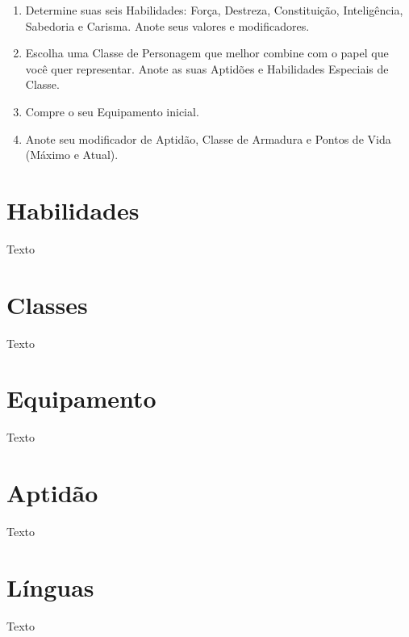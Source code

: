 \documentclass[a5paper, 10pt]{book}
\begin{document}
\begin{enumerate}
	\item Determine suas seis Habilidades: Força, Destreza, Constituição, Inteligência, Sabedoria e Carisma. Anote seus valores e modificadores.
	\item Escolha uma Classe de Personagem que melhor combine com o papel que você quer representar. Anote as suas Aptidões e Habilidades Especiais de Classe.
	\item Compre o seu Equipamento inicial.
	\item Anote seu modificador de Aptidão, Classe de Armadura e Pontos de Vida (Máximo e Atual).
\end{enumerate}

\section{Habilidades}

Texto

\section{Classes}

Texto

\section{Equipamento}

Texto

\section{Aptidão}

Texto

\section{Línguas}

Texto
\end{document}
